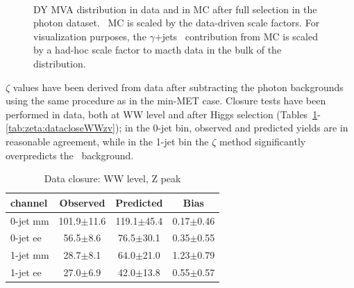 \begin{figure}[!hbtp]
\begin{center}
\\
\caption{DY MVA distribution in data and in MC after full selection in the photon dataset. 
\Wjets\ MC is scaled by the data-driven scale factors.
For visualization purposes, the $\gamma$+jets~ contribution from MC is scaled by a had-hoc scale factor to macth data in the bulk of the distribution.
}
\label{fig:dymva_scaled}
\end{center}
\end{figure}

$\zeta$ values have been derived from data after subtracting the photon backgrounds using the same procedure as in the min-MET case.
Closure tests have been performed in data, both at WW level and after Higgs selection (Tables~\ref{tab:zeta:datacloseWWzp}-\ref{tab:zeta:datacloseWWzv});
in the 0-jet bin, observed and predicted yields are in reasonable agreement, while in the 1-jet bin the $\zeta$ method significantly overpredicts the \dyll\ background.

\begin{table}[!hbtp]
{
 \begin{center}
 \begin{tabular}{l | c c c}
 \hline
channel       & Observed & Predicted & Bias \\
 \hline
0-jet  mm  &  101.9$\pm$11.6  &  119.1$\pm$45.4  &   0.17$\pm$0.46    \\
0-jet  ee  &   56.5$\pm$8.6   &   76.5$\pm$30.1  &   0.35$\pm$0.55    \\
 \hline
1-jet  mm  &   28.7$\pm$8.1   &   64.0$\pm$21.0  &   1.23$\pm$0.79    \\
1-jet  ee  &   27.0$\pm$6.9   &   42.0$\pm$13.8  &   0.55$\pm$0.57    \\
 \hline
\end{tabular}
\end{center}
}
\caption{Data closure: WW level, Z peak}
\label{tab:zeta:datacloseWWzp}
\end{table}

